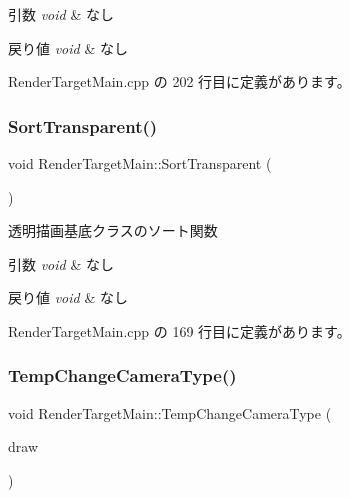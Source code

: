 \begin{DoxyParams}{引数}
{\em void} & なし \\
\hline
\end{DoxyParams}

\begin{DoxyRetVals}{戻り値}
{\em void} & なし \\
\hline
\end{DoxyRetVals}


 Render\+Target\+Main.\+cpp の 202 行目に定義があります。

\mbox{\label{class_render_target_main_a6d9b90e599744813fc013551eee5bfc0}} 
\subsubsection{\texorpdfstring{Sort\+Transparent()}{SortTransparent()}}
{\footnotesize\ttfamily void Render\+Target\+Main\+::\+Sort\+Transparent (\begin{DoxyParamCaption}{ }\end{DoxyParamCaption})\hspace{0.3cm}{\ttfamily [private]}}



透明描画基底クラスのソート関数 


\begin{DoxyParams}{引数}
{\em void} & なし \\
\hline
\end{DoxyParams}

\begin{DoxyRetVals}{戻り値}
{\em void} & なし \\
\hline
\end{DoxyRetVals}


 Render\+Target\+Main.\+cpp の 169 行目に定義があります。

\mbox{\label{class_render_target_main_a8f267db7731eac84b1a88d502d4c192d}} 
\subsubsection{\texorpdfstring{Temp\+Change\+Camera\+Type()}{TempChangeCameraType()}}
{\footnotesize\ttfamily void Render\+Target\+Main\+::\+Temp\+Change\+Camera\+Type (\begin{DoxyParamCaption}\item[{\mbox{\hyperlink{class_draw_base}{Draw\+Base}} $\ast$}]{draw }\end{DoxyParamCaption})\hspace{0.3cm}{\ttfamily [private]}}



